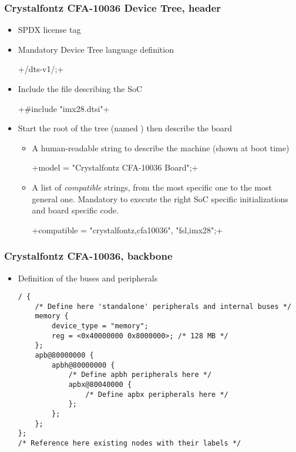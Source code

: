 \begin{frame}[fragile]
  \frametitle{Crystalfontz CFA-10036 Device Tree, header}
  \begin{itemize}
  \item SPDX license tag\\
  \item Mandatory Device Tree language definition\\
    \begin{block}{} +/dts-v1/;+ \end{block}
  \item Include the  file describing the SoC\\
    \begin{block}{}
      +#include "imx28.dtsi"+
    \end{block}
  \item Start the root of the tree (named \code{/}) then describe the board
    \begin{itemize}
    \item A human-readable string to describe the machine (shown at boot time)\\
      \begin{block}{}
        +model = "Crystalfontz CFA-10036 Board";+
      \end{block}
    \item A list of {\em compatible} strings, from the most specific one
      to the most general one. Mandatory to execute the right SoC specific
      initializations and board specific code.\\
      \begin{block}{}
        +compatible = "crystalfontz,cfa10036", "fsl,imx28";+
      \end{block}
    \end{itemize}
  \end{itemize}
\end{frame}

\begin{frame}[fragile]
  \frametitle{Crystalfontz CFA-10036, backbone}
  \begin{itemize}
  \item Definition of the buses and peripherals
    \begin{block}{}
      \begin{verbatim}
/ {
    /* Define here 'standalone' peripherals and internal buses */
    memory {
        device_type = "memory";
        reg = <0x40000000 0x8000000>; /* 128 MB */
    };
    apb@80000000 {
        apbh@80000000 {
            /* Define apbh peripherals here */
            apbx@80040000 {
                /* Define apbx peripherals here */
            };
        };
    };
};
/* Reference here existing nodes with their labels */
      \end{verbatim}
    \end{block}
  \end{itemize}
\end{frame}

